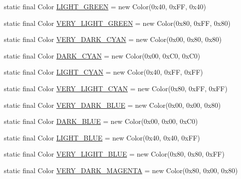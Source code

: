 \begin{DoxyCompactItemize}
\item 
static final Color \mbox{\hyperlink{classorg_1_1jfree_1_1chart_1_1_chart_color_a909385972a6c571d12dd7d43b6ef70e5}{L\+I\+G\+H\+T\+\_\+\+G\+R\+E\+EN}} = new Color(0x40, 0x\+F\+F, 0x40)
\item 
static final Color \mbox{\hyperlink{classorg_1_1jfree_1_1chart_1_1_chart_color_a56994d289c51eeed4f7f973eddbf01a7}{V\+E\+R\+Y\+\_\+\+L\+I\+G\+H\+T\+\_\+\+G\+R\+E\+EN}} = new Color(0x80, 0x\+F\+F, 0x80)
\item 
static final Color \mbox{\hyperlink{classorg_1_1jfree_1_1chart_1_1_chart_color_a5be8e6968f996fc88934cd1b759c6a7c}{V\+E\+R\+Y\+\_\+\+D\+A\+R\+K\+\_\+\+C\+Y\+AN}} = new Color(0x00, 0x80, 0x80)
\item 
static final Color \mbox{\hyperlink{classorg_1_1jfree_1_1chart_1_1_chart_color_a6e14f45adf1a4f786d38ae2ce3b89116}{D\+A\+R\+K\+\_\+\+C\+Y\+AN}} = new Color(0x00, 0x\+C0, 0x\+C0)
\item 
static final Color \mbox{\hyperlink{classorg_1_1jfree_1_1chart_1_1_chart_color_af4260ce62001516988b293e41987cf62}{L\+I\+G\+H\+T\+\_\+\+C\+Y\+AN}} = new Color(0x40, 0x\+F\+F, 0x\+F\+F)
\item 
static final Color \mbox{\hyperlink{classorg_1_1jfree_1_1chart_1_1_chart_color_a8471fd996821573ef5c66ee222e644cc}{V\+E\+R\+Y\+\_\+\+L\+I\+G\+H\+T\+\_\+\+C\+Y\+AN}} = new Color(0x80, 0x\+F\+F, 0x\+F\+F)
\item 
static final Color \mbox{\hyperlink{classorg_1_1jfree_1_1chart_1_1_chart_color_a802e26209c0401fa3d425cfb08808bce}{V\+E\+R\+Y\+\_\+\+D\+A\+R\+K\+\_\+\+B\+L\+UE}} = new Color(0x00, 0x00, 0x80)
\item 
static final Color \mbox{\hyperlink{classorg_1_1jfree_1_1chart_1_1_chart_color_a06bcfbec1171d0d870a79fe2758eb414}{D\+A\+R\+K\+\_\+\+B\+L\+UE}} = new Color(0x00, 0x00, 0x\+C0)
\item 
static final Color \mbox{\hyperlink{classorg_1_1jfree_1_1chart_1_1_chart_color_a8972360b617ec2ddea2650ddbcbd763e}{L\+I\+G\+H\+T\+\_\+\+B\+L\+UE}} = new Color(0x40, 0x40, 0x\+F\+F)
\item 
static final Color \mbox{\hyperlink{classorg_1_1jfree_1_1chart_1_1_chart_color_ab2dbcd29c5bd75b6ba167a306be6dc06}{V\+E\+R\+Y\+\_\+\+L\+I\+G\+H\+T\+\_\+\+B\+L\+UE}} = new Color(0x80, 0x80, 0x\+F\+F)
\item 
static final Color \mbox{\hyperlink{classorg_1_1jfree_1_1chart_1_1_chart_color_a2ff6114610dd672989f4f5a129512355}{V\+E\+R\+Y\+\_\+\+D\+A\+R\+K\+\_\+\+M\+A\+G\+E\+N\+TA}} = new Color(0x80, 0x00, 0x80)
\item 

\end{DoxyCompactItemize}
